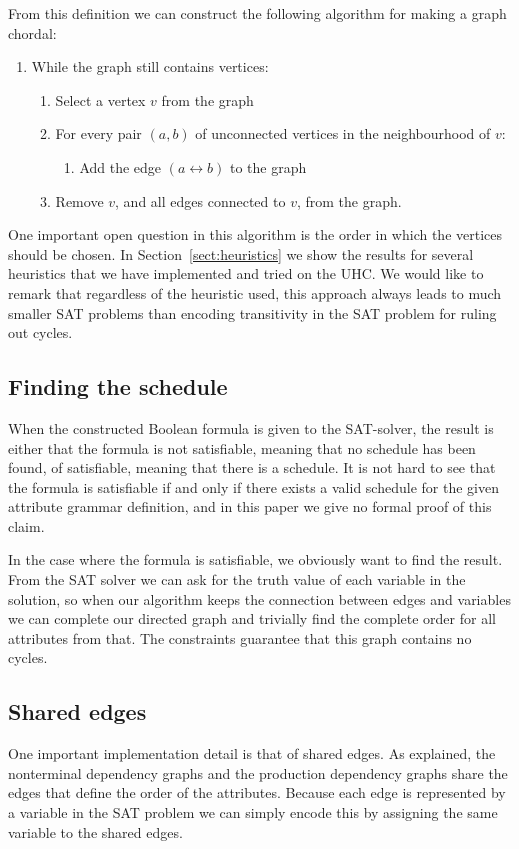 \documentclass{llncs}
\newcommand{\sectref}[1]{Section~\ref{#1}}
\begin{document}
From this definition we can construct the following algorithm for making a graph chordal:
\begin{enumerate}
 \item While the graph still contains vertices:
 \begin{enumerate}
     \item Select a vertex $v$ from the graph
     \item For every pair $(a,b)$ of unconnected vertices in the neighbourhood
        of $v$: 
        \begin{enumerate}
            \item Add the edge $(a\leftrightarrow b)$ to the graph
        \end{enumerate}
     \item Remove $v$, and all edges connected to $v$, from the graph.
 \end{enumerate}
\end{enumerate}

One important open question in this algorithm is the order in which the vertices should be chosen. In \sectref{sect:heuristics} we show the results for several heuristics that we have implemented and tried on the UHC. We would like to remark that regardless of the heuristic used, this approach always leads to much smaller SAT problems than encoding transitivity in the SAT problem for ruling out cycles.

\subsection{Finding the schedule}
When the constructed Boolean formula is given to the SAT-solver, the result is either that the formula is not satisfiable, meaning that no schedule has been found, of satisfiable, meaning that there is a schedule. It is not hard to see that the formula is satisfiable if and only if there exists a valid schedule for the given attribute grammar definition, and in this paper we give no formal proof of this claim.

In the case where the formula is satisfiable, we obviously want to find the result. From the SAT solver we can ask for the truth value of each variable in the solution, so when our algorithm keeps the connection between edges and variables we can complete our directed graph and trivially find the complete order for all attributes from that. The constraints guarantee that this graph contains no cycles.

\subsection{Shared edges}
One important implementation detail is that of shared edges. As explained, the nonterminal dependency graphs and the production dependency graphs share the edges that define the order of the attributes. Because each edge is represented by a variable in the SAT problem we can simply encode this by assigning the same variable to the shared edges.
\end{document}
